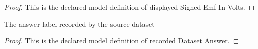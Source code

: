 \begin{proof}
  This is the declared model definition of displayed Signed Emf In Volts.
\end{proof}
\begin{definition}
  \label{def:physics:phyx-mini-0918:phyxminiproblems-problemphyxmini0918-recordeddatasetanswer}
  The answer label recorded by the source dataset
\end{definition}
\begin{proof}
  This is the declared model definition of recorded Dataset Answer.
\end{proof}

